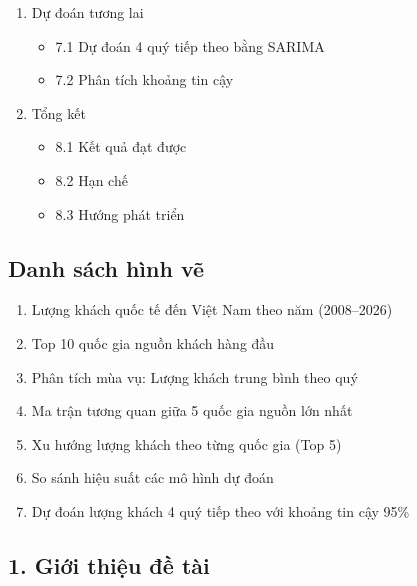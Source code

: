 \documentclass[11pt]{article}
\providecommand{\tightlist}{%
      \setlength{\itemsep}{0pt}\setlength{\parskip}{0pt}}
\begin{document}
\begin{enumerate}
  \begin{itemize}
  \tightlist
  \item
    6.1 GridSearchCV cho Random Forest
  \item
    6.2 RandomizedSearchCV cho XGBoost
  \item
    6.3 Kết quả sau tối ưu
  \end{itemize}
\item
  Dự đoán tương lai

  \begin{itemize}
  \tightlist
  \item
    7.1 Dự đoán 4 quý tiếp theo bằng SARIMA
  \item
    7.2 Phân tích khoảng tin cậy
  \end{itemize}
\item
  Tổng kết

  \begin{itemize}
  \tightlist
  \item
    8.1 Kết quả đạt được
  \item
    8.2 Hạn chế
  \item
    8.3 Hướng phát triển
  \end{itemize}
\end{enumerate}

    \subsection{Danh sách hình vẽ}\label{danh-suxe1ch-huxecnh-vux1ebd}

\begin{enumerate}
\def\labelenumi{\arabic{enumi}.}
\tightlist
\item
  Lượng khách quốc tế đến Việt Nam theo năm (2008--2026)
\item
  Top 10 quốc gia nguồn khách hàng đầu
\item
  Phân tích mùa vụ: Lượng khách trung bình theo quý
\item
  Ma trận tương quan giữa 5 quốc gia nguồn lớn nhất
\item
  Xu hướng lượng khách theo từng quốc gia (Top 5)
\item
  So sánh hiệu suất các mô hình dự đoán
\item
  Dự đoán lượng khách 4 quý tiếp theo với khoảng tin cậy 95\%
\end{enumerate}

    \subsection{1. Giới thiệu đề
tài}\label{giux1edbi-thiux1ec7u-ux111ux1ec1-tuxe0i}
\end{document}
